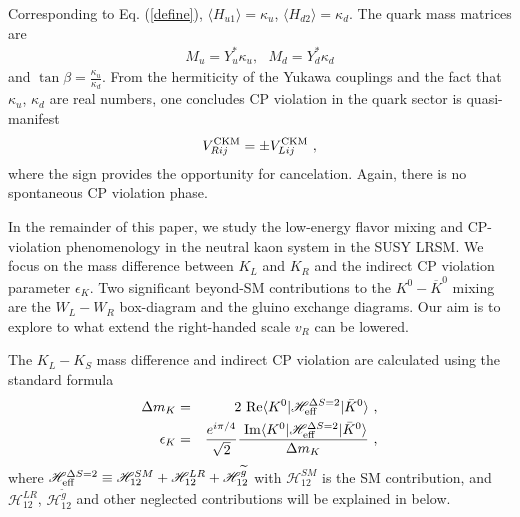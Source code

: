 \documentclass[prd,aps,preprint,tightenlines,superscriptaddress]{revtex4}
\begin{document}
Corresponding to Eq. (\ref{define}), $\langle H_{u1} \rangle = \kappa_u$, $\langle H_{d2} \rangle = \kappa_d$. The quark mass matrices are
\begin{eqnarray}\label{mass}
M_u = Y_u^* \kappa_u, \ \ \ M_d = Y^*_d \kappa_d
\end{eqnarray}
and $\tan\beta = \displaystyle \frac{\kappa_u}{\kappa_d}$. From the hermiticity of the Yukawa couplings and the fact that $\kappa_u$, $\kappa_d$ are real numbers, one concludes CP violation in the quark sector is quasi-manifest~\cite{Kiers:2002cz}
\begin{eqnarray}\label{10}
V_{Rij}^{\rm CKM} = \pm V_{Lij}^{\rm CKM} \ ,
\end{eqnarray}
where the sign provides the opportunity for cancelation. Again, there is no spontaneous CP violation phase.

In the remainder of this paper, we study the low-energy flavor mixing and CP-violation phenomenology
in the neutral kaon system in the SUSY LRSM. We focus on the mass difference between $K_L$ and
$K_R$ and the indirect CP violation parameter $\epsilon_K$. Two significant beyond-SM contributions
to the $K^0-\overline K^0$ mixing are the $W_L-W_R$ box-diagram and the gluino exchange diagrams.
Our aim is to explore to what extend the right-handed scale $v_R$ can be lowered.

The $K_L-K_S$ mass difference and indirect CP violation are calculated using the standard
formula
\begin{eqnarray}
\Delta m_K &=& 2 {~\rm Re} \langle K^0 | \mathscr{H}^{\Delta S=2}_{\rm eff}
| \bar{K}^0 \rangle \ , \nonumber \\
\epsilon_K &=&  \frac{e^{i \pi/4}}{\sqrt{2}} \frac{~{\rm Im} \langle K^0 |
\mathscr{H}^{\Delta S=2}_{\rm eff} | \bar{K}^0 \rangle}{ \Delta m_K } \ ,
\end{eqnarray}
where $\mathscr{H}^{\Delta S=2}_{\rm eff} \equiv\mathscr H_{12}^{SM} +\mathscr H_{12}^{LR} +\mathscr
H_{12}^{\widetilde g}$ with $\mathscr H_{12}^{SM}$ is the SM contribution, and $\mathscr H_{12}^{LR}$,
$\mathscr H_{12}^{\widetilde g}$ and other neglected contributions will be explained in below.
\end{document}
